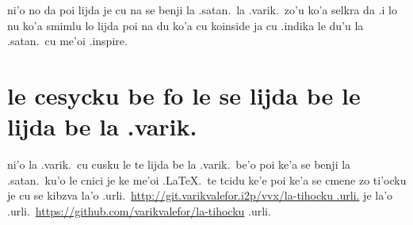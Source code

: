 \documentclass{article}
\begin{document}
ni'o no da poi lijda je cu na se benji la .satan.\ la .varik.\ zo'u ko'a selkra da .i lo nu ko'a smimlu lo lijda poi na du ko'a cu koinside ja cu .indika le du'u la .satan.\ cu me'oi .inspire.

\section{le cesycku be fo le se lijda be le lijda be la .varik.}
ni'o la .varik.\ cu cusku le te lijda be la .varik.\ be'o poi ke'a se benji la .satan.\ ku'o le cnici je ke me'oi .\LaTeX.\ te tcidu ke'e poi ke'a se cmene zo ti'ocku je cu se kibzva la'o .urli.\ \url{http://git.varikvalefor.i2p/vvx/la-tihocku .urli.} je la'o .urli.\ \url{https://github.com/varikvalefor/la-tihocku} .urli.
\end{document}
